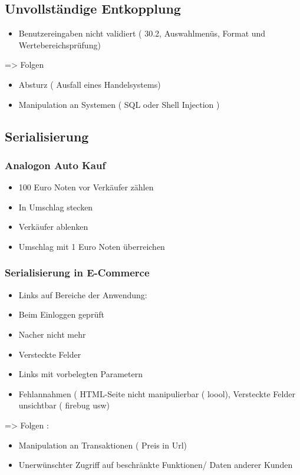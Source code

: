 \subsection*{Unvollständige Entkopplung}
\begin{itemize}
	\item Benutzereingaben nicht validiert ( 30.2, Auswahlmenüs, Format und Wertebereichsprüfung)
\end{itemize}
	=> Folgen
	\begin{itemize}
		\item Absturz ( Ausfall eines Handelsystems)
		\item Manipulation an Systemen ( SQL oder Shell Injection )
	\end{itemize}

\subsection*{ Serialisierung}
\subsubsection*{Analogon Auto Kauf}
\begin{itemize}
	\item 100 Euro Noten vor Verkäufer zählen
	\item In Umschlag stecken
	\item Verkäufer ablenken
	\item Umschlag mit 1 Euro Noten überreichen
\end{itemize}

\subsubsection*{Serialisierung in E-Commerce }
\begin{itemize}
	\item Links auf Bereiche der Anwendung:
	\item Beim Einloggen geprüft
	\item Nacher nicht mehr
	\item Versteckte Felder
	\item Links mit vorbelegten Parametern
	\item Fehlannahmen ( HTML-Seite nicht manipulierbar ( loool), Versteckte Felder unsichtbar ( firebug usw)
\end{itemize}
=> Folgen : 
\begin{itemize}
	\item Manipulation an Transaktionen ( Preis in Url)
	\item Unerwünschter Zugriff auf beschränkte Funktionen/ Daten anderer Kunden 
\end{itemize}



